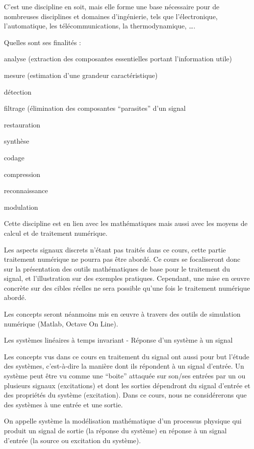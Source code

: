 \documentclass[]{article}
\begin{document}
C'est une discipline en soit, mais elle forme une base nécessaire pour
de nombreuses disciplines et domaines d'ingénierie, tels que
l'électronique, l'automatique, les télécommunications, la
thermodynamique, \ldots{}.

Quelles sont ses finalités :

analyse (extraction des composantes essentielles portant l'information
utile)

mesure (estimation d'une grandeur caractéristique)

détection

filtrage (élimination des composantes ``parasites'' d'un signal

restauration

synthèse

codage

compression

reconnaissance

modulation

Cette discipline est en lien avec les mathématiques mais aussi avec les
moyens de calcul et de traitement numérique.

Les aspects signaux discrets n'étant pas traités dans ce cours, cette
partie traitement numérique ne pourra pas être abordé. Ce cours se
focaliseront donc sur la présentation des outils mathématiques de base
pour le traitement du signal, et l'illustration sur des exemples
pratiques. Cependant, une mise en œuvre concrète sur des cibles réelles
ne sera possible qu'une fois le traitement numérique abordé.

Les concepts seront néanmoins mis en œuvre à travers des outils de
simulation numérique (Matlab, Octave On Line).~

Les systèmes linéaires à temps invariant - Réponse d'un système à un
signal

Les concepts vus dans ce cours en traitement du signal ont aussi pour
but l'étude des systèmes, c'est-à-dire la manière dont ils répondent à
un signal d'entrée. Un système peut être vu comme une ``boite'' attaquée
sur son/ses entrées par un ou plusieurs signaux (excitations) et dont
les sorties dépendront du signal d'entrée et des propriétés du système
(excitation). Dans ce cours, nous ne considérerons que des systèmes à
une entrée et une sortie.~

On appelle système la modélisation mathématique d'un processus physique
qui produit un signal de sortie (la réponse du système) en réponse à un
signal d'entrée (la source ou excitation du système).
\end{document}
